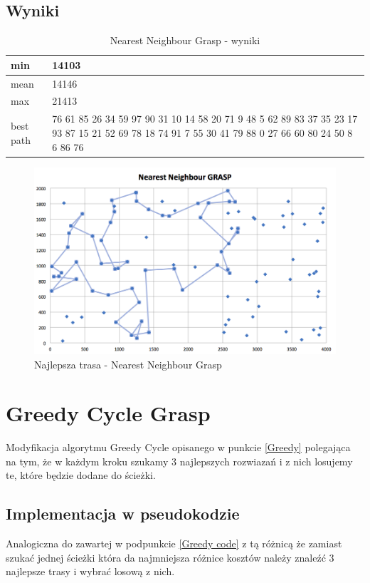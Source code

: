 \documentclass[a4paper 10pt]{article}
\begin{document}
\subsection{Wyniki}

\begin{table}[H]
\center
\caption{Nearest Neighbour Grasp - wyniki}
\label{Nearest Neighbour Grasp- wyniki}
\begin{tabular}{|p{1cm}|p{14cm}|}
\hline
min       &  14103\\ \hline
mean      &  14146\\ \hline
max       &  21413\\ \hline
best path &  76
61
85
26
34
59
97
90
31
10
14
58
20
71
9 
48
5 
62
89
83
37
35
23
17
93
87
15
21
52
69
78
18
74
91
7 
55
30
41
79
88
0 
27
66
60
80
24
50
8 
6 
86
76 \\ \hline
\end{tabular}
\end{table}

\begin{figure} [H]
\centering
\includegraphics[angle=0,width = 1\textwidth, height=!]{images/NNG.png}
\caption{Najlepsza trasa - Nearest Neighbour Grasp}
\label{Rys. NNG}
\end{figure}
\section{Greedy Cycle Grasp}
Modyfikacja algorytmu Greedy Cycle opisanego w punkcie \ref{Greedy} polegająca na tym, że w każdym kroku szukamy 3 najlepszych rozwiazań i z nich losujemy te, które będzie dodane do ścieżki.
\subsection{Implementacja w pseudokodzie}
Analogiczna do zawartej w podpunkcie \ref{Greedy code} z tą różnicą że zamiast szukać jednej ścieżki która da najmniejsza różnice kosztów należy znaleźć 3 najlepsze trasy i wybrać losową z nich.
\end{document}

